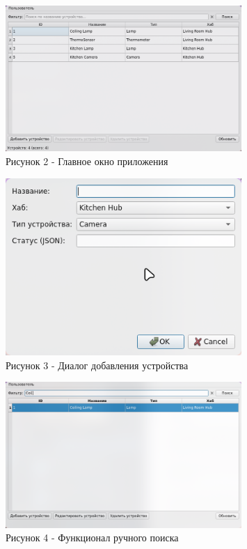 \documentclass[oneside,a4paper,14pt]{extarticle}
\begin{document}
\begin{figure}[H]
  \centering
  \includegraphics[width=0.8\textwidth]{pics/main_window.png}
  \caption{Рисунок 2 - Главное окно приложения}
\end{figure}

\begin{figure}[H]
  \centering
  \includegraphics[width=0.8\textwidth]{pics/device_dialog.png}
  \caption{Рисунок 3 - Диалог добавления устройства}
\end{figure}

\begin{figure}[H]
  \centering
  \includegraphics[width=0.8\textwidth]{pics/search_functionality.png}
  \caption{Рисунок 4 - Функционал ручного поиска}
\end{figure}
\end{document}
